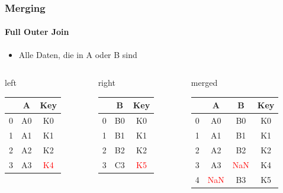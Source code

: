 \documentclass[12pt,ngerman]{beamer}
\def\firstcircle{(0,0) circle (2cm)}
\def\secondcircle{(0:3cm) circle (2cm)}
\begin{document}
\begin{frame}
\frametitle{Merging}
\framesubtitle{Full Outer Join}

\begin{itemize}
\item Alle Daten, die in A oder B sind
\end{itemize}

\begin{center}
\end{center}

{\footnotesize
\begin{columns}
\begin{column}{0.3\textwidth}
left \\
\begin{tabular}{c|cc} \toprule
   & A  &  Key \\ \midrule
0 & A0 &  K0 \\
1 & A1 &  K1 \\ 
2 & A2 &  K2 \\
3 & A3 &  \textcolor{red}{K4} \\ \bottomrule
\end{tabular}
\vspace*{1.2em}
\end{column}
\begin{column}{0.27\textwidth}
right \\
\begin{tabular}{c|cc} \toprule
   &  B   & Key \\ \midrule
0 &  B0 & K0 \\
1 &  B1 & K1 \\ 
2 &  B2 & K2 \\
3 &  C3 & \textcolor{red}{K5} \\ \bottomrule
\end{tabular}
\vspace*{1.2em}
\end{column}
\begin{column}{0.3\textwidth}
merged \\
\begin{tabular}{c|ccc} \toprule
   & A  & B   & Key \\ \midrule
0 & A0 & B0 & K0 \\
1 & A1 & B1 & K1 \\ 
2 & A2 & B2 & K2 \\ 
3 & A3 & \textcolor{red}{NaN} & K4 \\ 
4 & \textcolor{red}{NaN} & B3 & K5 \\ \bottomrule
\end{tabular} \\
\vspace*{0.2em}
\end{column}
\end{columns}}



\end{frame}
\end{document}

